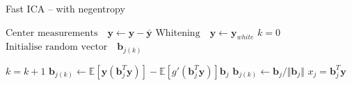 \begin{algorithm}[H]
\caption{Fast ICA -- with negentropy }
\begin{algorithmic}[1]
			\State $\text{Center measurements} \quad \textbf{y} \gets \textbf{y} - \bar{\textbf{y}}$
			\State $\text{Whitening} \quad \textbf{y}\gets \textbf{y}_{white}$ 
			\EndProcedure  
			\State
			\State$k=0$            
            \State$\text{Initialise random vector} \quad \textbf{b}_{j(k)}$ 
            
               		\State $k = k+1$
                	\State $\textbf{b}_{j(k)} \gets \mathbb{E}[ \textbf{y}(\textbf{b}_{j}^T \textbf{y})] - \mathbb{E}[g'(\textbf{b}_{j}^T \textbf{y})] \textbf{b}_{j}$  
                	\State $\textbf{b}_{j(k)} \gets \textbf{b}_j/\Vert \textbf{b}_j \Vert $ 
          		\EndWhile
          		\State $x_{j} = \textbf{b}_{j}^T\textbf{y}$
          	\EndFor
          	
            \EndProcedure
        \end{algorithmic} 
        \label{alg:fastICA}
\end{algorithm}



